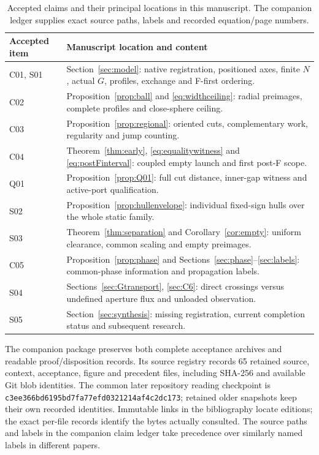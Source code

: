\begin{table}[htbp]\centering\small
\caption{Accepted claims and their principal locations in this manuscript. The companion ledger supplies exact source paths, labels and recorded equation/page numbers.}\label{tab:claims}
\begin{tabularx}{\textwidth}{@{}lX@{}}\toprule
Accepted item & Manuscript location and content\\\midrule
C01, S01 & Section~\ref{sec:model}: native registration, positioned axes, finite $N$, actual $G$, profiles, exchange and F-first ordering.\\
C02 & Proposition~\ref{prop:ball} and \eqref{eq:widthceiling}: radial preimages, complete profiles and close-sphere ceiling.\\
C03 & Proposition~\ref{prop:regional}: oriented cuts, complementary work, regularity and jump counting.\\
C04 & Theorem~\ref{thm:early}, \eqref{eq:equalitywitness} and \eqref{eq:postFinterval}: coupled empty launch and first post-F scope.\\
Q01 & Proposition~\ref{prop:Q01}: full cut distance, inner-gap witness and active-port qualification.\\
S02 & Proposition~\ref{prop:hullenvelope}: individual fixed-sign hulls over the whole static family.\\
S03 & Theorem~\ref{thm:separation} and Corollary~\ref{cor:empty}: uniform clearance, common scaling and empty preimages.\\
C05 & Proposition~\ref{prop:phase} and Sections~\ref{sec:phase}--\ref{sec:labels}: common-phase information and propagation labels.\\
S04 & Sections~\ref{sec:Gtransport}, \ref{sec:C6}: direct crossings versus undefined aperture flux and unloaded observation.\\
S05 & Section~\ref{sec:synthesis}: missing registration, current completion status and subsequent research.\\\bottomrule
\end{tabularx}
\end{table}

The companion package preserves both complete acceptance archives and readable proof/disposition records. Its source registry records 65 retained source, context, acceptance, figure and precedent files, including SHA-256 and available Git blob identities. The common later repository reading checkpoint is \texttt{c3ee366bd6195bd7fa77efd0321214af4c2dc173}; retained older snapshots keep their own recorded identities. Immutable links in the bibliography locate editions; the exact per-file records identify the bytes actually consulted. The source paths and labels in the companion claim ledger take precedence over similarly named labels in different papers.

